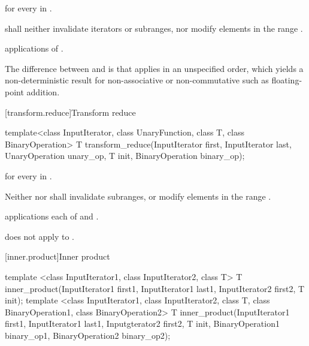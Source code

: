 \begin{itemdescr}
\pnum
\returns
{} for every  in .

\pnum
\requires
{} shall neither invalidate iterators or subranges, nor modify
elements in the range .

\pnum
\complexity
{} applications of .

\pnum
\realnotes
The difference between  and  is that
 applies  in an unspecified order, which yields
a non-deterministic result for non-associative or non-commutative
 such as floating-point addition.
\end{itemdescr}

[transform.reduce]{Transform reduce}

%
\begin{itemdecl}
template<class InputIterator, class UnaryFunction, class T, class BinaryOperation>
  T transform_reduce(InputIterator first, InputIterator last,
                     UnaryOperation unary_op, T init, BinaryOperation binary_op);
\end{itemdecl}

\begin{itemdescr}
\pnum
\returns
{} for every  in .

\pnum
\requires
Neither  nor  shall invalidate subranges, or
modify elements in the range .

\pnum
\complexity
{} applications each of  and
.

\pnum
\realnotes
{} does not apply  to .
\end{itemdescr}

[inner.product]{Inner product}
%

%
\begin{itemdecl}
template <class InputIterator1, class InputIterator2, class T>
  T inner_product(InputIterator1 first1, InputIterator1 last1,
                  InputIterator2 first2, T init);
template <class InputIterator1, class InputIterator2, class T,
          class BinaryOperation1, class BinaryOperation2>
  T inner_product(InputIterator1 first1, InputIterator1 last1,
                  Inputgterator2 first2, T init,
                  BinaryOperation1 binary_op1,
                  BinaryOperation2 binary_op2);
\end{itemdecl}

